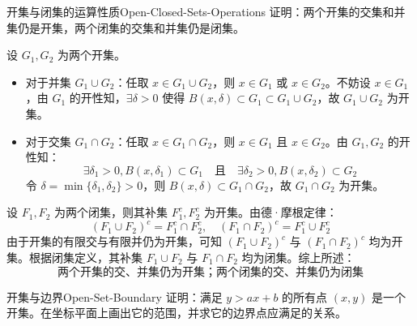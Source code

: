 \begin{problem}{开集与闭集的运算性质}{Open-Closed-Sets-Operations}
    证明：两个开集的交集和并集仍是开集，两个闭集的交集和并集仍是闭集。
\end{problem}

\begin{myproof}
    设 $G_1, G_2$ 为两个开集。
    \begin{itemize}
        \item 对于并集 $G_1 \cup G_2$：任取 $x \in G_1 \cup G_2$，则 $x \in G_1$ 或 $x \in G_2$。不妨设 $x \in G_1$，由 $G_1$ 的开性知，$\exists \delta > 0$ 使得 $B(x, \delta) \subset G_1 \subset G_1 \cup G_2$，故 $G_1 \cup G_2$ 为开集。
        \item 对于交集 $G_1 \cap G_2$：任取 $x \in G_1 \cap G_2$，则 $x \in G_1$ 且 $x \in G_2$。由 $G_1, G_2$ 的开性知：
              \begin{equation}
                  \exists \delta_1 > 0, B(x, \delta_1) \subset G_1 \quad \text{且} \quad \exists \delta_2 > 0, B(x, \delta_2) \subset G_2
              \end{equation}
              令 $\delta = \min\{\delta_1, \delta_2\} > 0$，则 $B(x, \delta) \subset G_1 \cap G_2$，故 $G_1 \cap G_2$ 为开集。
    \end{itemize}
    设 $F_1, F_2$ 为两个闭集，则其补集 $F_1^c, F_2^c$ 为开集。由德·摩根定律：
    \begin{equation}
        (F_1 \cup F_2)^c = F_1^c \cap F_2^c, \quad (F_1 \cap F_2)^c = F_1^c \cup F_2^c
    \end{equation}
    由于开集的有限交与有限并仍为开集，可知 $(F_1 \cup F_2)^c$ 与 $(F_1 \cap F_2)^c$ 均为开集。根据闭集定义，其补集 $F_1 \cup F_2$ 与 $F_1 \cap F_2$ 均为闭集。综上所述：
    \begin{equation}
        \boxed{\text{两个开集的交、并集仍为开集；两个闭集的交、并集仍为闭集}}
    \end{equation}
\end{myproof}


\begin{problem}{开集与边界}{Open-Set-Boundary}
    证明：满足 $y > ax + b$ 的所有点 $(x, y)$ 是一个开集。在坐标平面上画出它的范围，并求它的边界点应满足的关系。
\end{problem}

